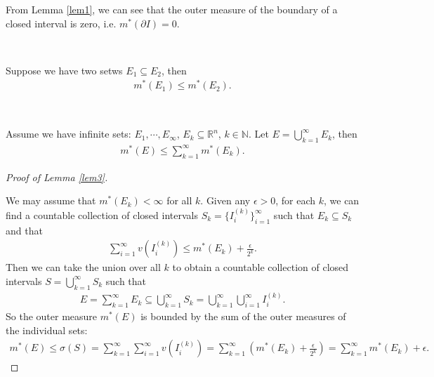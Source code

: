 From Lemma \ref{lem1}, we can see that the outer measure of the boundary of a closed interval is zero, i.e. $ m^* (\partial I) = 0 $.

\begin{lemma}\label{lem2}
    \

    Suppose we have two setws $E_1 \subseteq E_2$, then
    \begin{gather*}
        m^{*}(E_1) \leq m^{*}(E_2).
    \end{gather*}
\end{lemma}

\begin{lemma}\label{lem3}
    \

    Assume we have infinite sets: $E_1, \cdots, E_{\infty}$, $E_k \subseteq \mathbb{R}^n$, $k \in \mathbb{N}$.
    Let $E = \bigcup_{k=1}^{\infty} E_k$,
    then
    \begin{gather*}
        m^{*}(E) \leq \sum_{k=1}^{\infty} m^{*}(E_k).
    \end{gather*}
\end{lemma}

\begin{proof}[Proof of Lemma \ref{lem3}]
    \

    We may assume that $m^{*}(E_k) < \infty$ for all $k$.
    Given any $\epsilon > 0$, for each $k$,
    we can find a countable collection of closed intervals $S_k = \{I_{i}^{(k)}\}_{i=1}^{\infty}$ such that
    $E_k \subseteq S_k$ and that
    \begin{gather*}
        \sum_{i=1}^{\infty} v(I_{i}^{(k)}) \leq m^{*}(E_k) + \frac{\epsilon}{2^k}.
    \end{gather*}
    Then we can take the union over all $k$ to obtain a countable collection of closed intervals $S = \bigcup_{k=1}^{\infty} S_k$ such that
    \begin{gather*}
        E = \sum_{k=1}^{\infty} E_k \subseteq \bigcup_{k=1}^{\infty} S_k = \bigcup_{k=1}^{\infty} \bigcup_{i=1}^{\infty} I_{i}^{(k)}.
    \end{gather*}
    So the outer measure $m^*(E)$ is bounded by the sum of the outer measures of the individual sets:
    \begin{gather*}
        m^{*}(E) \leq \sigma(S) = \sum_{k=1}^{\infty} \sum_{i=1}^{\infty} v(I_{i}^{(k)}) = \sum_{k=1}^{\infty} \left( m^{*}(E_k) + \frac{\epsilon}{2^k} \right) = \sum_{k=1}^{\infty} m^{*}(E_k) + \epsilon.
    \end{gather*}
\end{proof}

